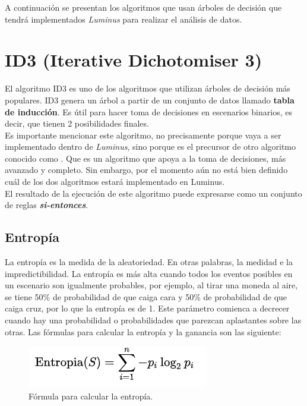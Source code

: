 A continuación se presentan los algoritmos que usan árboles de decisión que tendrá implementados \emph{Luminus} para realizar el análisis de datos.

\section{ID3 (Iterative Dichotomiser 3)} \label{id3}

El algoritmo ID3 es uno de los algoritmos que utilizan árboles de decisión más populares. ID3 genera un árbol a partir de un conjunto de datos llamado \textbf{tabla de inducción}. Es útil para hacer toma de decisiones en escenarios binarios, es decir, que tienen 2 posibilidades finales.\cite{id3}\\

Es importante mencionar este algoritmo, no precisamente porque vaya a ser implementado dentro de \emph{Luminus}, sino porque es el precursor de otro algoritmo conocido como . Que es un algoritmo que apoya a la toma de decisiones, más avanzado y completo. Sin embargo, por el momento aún no está bien definido cuál de los dos algoritmos estará implementado en Luminus.\\

El resultado de la ejecución de este algoritmo puede expresarse como un conjunto de reglas \textbf{\textit{si-entonces}}.\\

\subsection{Entropía}
La entropía es la medida de la aleatoriedad. En otras palabras, la medidad e la impredictibilidad. La entropía es más alta cuando todos los eventos posibles en un escenario son igualmente probables, por ejemplo, al tirar una moneda al aire, se tiene 50\% de probabilidad de que caiga cara y 50\% de probabilidad de que caiga cruz, por lo que la entropía es de 1. Este parámetro comienca a decrecer cuando hay una probabilidad o probabilidades que parezcan aplastantes sobre las otras. Las fórmulas para calcular la entropía y la ganancia son las siguiente:\\

\begin{figure}[!htbp]
	\hypertarget{fig:formula-entropia}{\hspace{1pt}}
	\begin{center}
		\includegraphics{capitulo2/images/formula-entropia.png}
		\caption{Fórmula para calcular la entropía.}
		\label{fig:formula-entropia}
	\end{center}
\end{figure}

